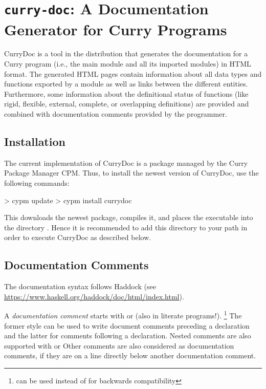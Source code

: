 \section{\texttt{curry-doc}: A Documentation Generator for Curry Programs}

CurryDoc%
is a tool in the \CYS distribution that generates
the documentation for a Curry program (i.e., the main module
and all its imported modules) in HTML format.
The generated HTML pages contain information about
all data types and functions exported by a module as well
as links between the different entities.
Furthermore, some information about the definitional status
of functions (like rigid, flexible, external, complete, or
overlapping definitions) are provided and combined with
documentation comments provided by the programmer.

\subsection{Installation}

The current implementation of CurryDoc is a package
managed by the Curry Package Manager CPM.
Thus, to install the newest version of CurryDoc, use the following commands:
%
\begin{curry}
> cypm update
> cypm install currydoc
\end{curry}
%
This downloads the newest package, compiles it, and places
the executable  into the directory .
Hence it is recommended to add this directory to your path
in order to execute CurryDoc as described below.

\subsection{Documentation Comments}

The documentation syntax follows Haddock
(see \url{https://www.haskell.org/haddock/doc/html/index.html}).

A \emph{documentation comment}%
starts with \ccode{-{}- | } or \ccode{-{}- \textasciicircum }
(also in literate programs!).
\footnote{\ccode{-{}-{}- } can be used instead of
          \ccode{-{}- | } for backwards compatibility}
The former style can be used to write document comments preceding a declaration
and the latter for comments following a declaration.
Nested comments are also supported with  \ccode{\{- | }
or \ccode{\{- \textasciicircum}
Other comments are also considered as documentation comments, if they are
on a line directly below another documentation comment.

